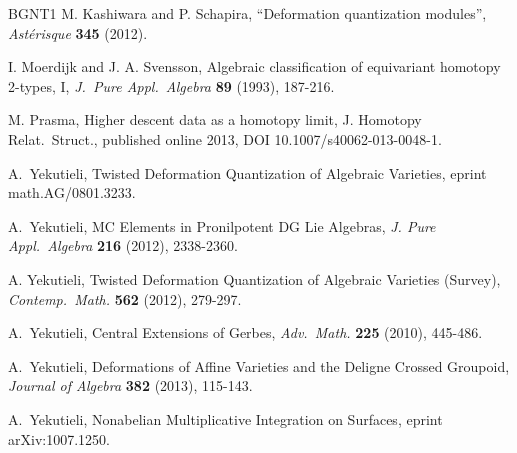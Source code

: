 \documentclass[a4paper,10pt]{amsart}
\theoremstyle{definition}
\numberwithin{equation}{section}
\begin{document}
\begin{thebibliography}{BGNT1}
 M. Kashiwara and P. Schapira,
``Deformation quantization modules'', 
{\em Ast\'erisque} {\bf 345} (2012). 

 I. Moerdijk and J. A. Svensson,
  Algebraic classification of equivariant homotopy 2-types, I,
  {\em J.\ Pure Appl.\ Algebra} {\bf 89} (1993), 187-216.

 M. Prasma, 
Higher descent data as a homotopy limit,
J. Homotopy Relat.\ Struct., published online 2013,
DOI 10.1007/s40062-013-0048-1.

 A.\ Yekutieli,
    Twisted Deformation Quantization of Algebraic Varieties,
    eprint math.AG/0801.3233.

 A.\ Yekutieli,
	MC Elements in Pronilpotent DG Lie Algebras,
{\em J. Pure Appl.\ Algebra} {\bf 216} (2012), 2338-2360.

 A. Yekutieli,
Twisted Deformation Quantization of Algebraic Varieties (Survey), 
{\em Contemp.\ Math.} {\bf 562} (2012), 279-297. 

 A.\ Yekutieli, 
  Central Extensions of Gerbes,  {\em Adv.\ Math.} {\bf 225} (2010), 445-486.

 A.\ Yekutieli, 
Deformations of Affine Varieties and the Deligne Crossed Groupoid,
{\em Journal of Algebra} {\bf 382} (2013), 115-143.

 A.\ Yekutieli, 
	Nonabelian Multiplicative Integration on Surfaces, 
	eprint arXiv:1007.1250.

\end{thebibliography}
\end{document}
